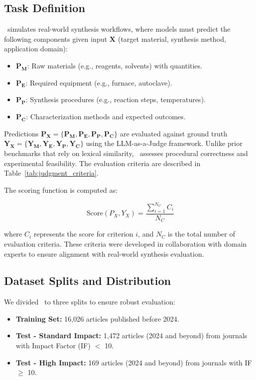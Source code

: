 \subsection{Task Definition}
\label{subsec:task_definition}

\oursbench~simulates real-world synthesis workflows, where models must predict the following components given input $\mathbf{X}$ (target material, synthesis method, application domain):

\begin{itemize}
    \item $\mathbf{P_M}$: Raw materials (e.g., reagents, solvents) with quantities.
    \item $\mathbf{P_E}$: Required equipment (e.g., furnace, autoclave).
    \item $\mathbf{P_P}$: Synthesis procedures (e.g., reaction steps, temperatures).
    \item $\mathbf{P_C}$: Characterization methods and expected outcomes.
\end{itemize}


Predictions $\mathbf{P_X} = \{\mathbf{P_M,P_E,P_P,P_C}\}$ are evaluated against ground truth $\mathbf{Y_X} = \{\mathbf{Y_M,Y_E,Y_P,Y_C}\}$ using the LLM-as-a-Judge framework. Unlike prior benchmarks that rely on lexical similarity, \oursbench\ assesses procedural correctness and experimental feasibility. The evaluation criteria are described in Table~\ref{tab:judgment_criteria}.

The scoring function is computed as:

\[
\text{Score}(P_X, Y_X) = \frac{\sum_{i=1}^{N_C} C_i}{N_C}
\]

where $C_i$ represents the score for criterion $i$, and $N_C$ is the total number of evaluation criteria. These criteria were developed in collaboration with domain experts to ensure alignment with real-world synthesis evaluation.

\subsection{Dataset Splits and Distribution}
\label{subsec:dataset_splits}

We divided \oursdatashort~to three splits to ensure robust evaluation:

\begin{itemize}
    \item \textbf{Training Set:} 16,026 articles published before 2024.
    \item \textbf{Test - Standard Impact:} 1,472 articles (2024 and beyond) from journals with Impact Factor (IF) $<$ 10.
    \item \textbf{Test - High Impact:} 169 articles (2024 and beyond) from journals with IF $\geq$ 10.
\end{itemize}

